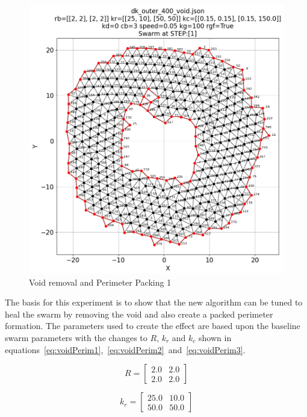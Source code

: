 \documentclass[12pt,a4paper]{IEEEtran}
\newcommand{\kc}{\mathit{k_{c}}}
\newcommand{\kr}{\mathit{k_{r}}}
\newcommand{\rb}{\mathit{R}}
\begin{document}
\begin{figure}[H]
	\begin{center}
		\includegraphics[width=1.0\linewidth]{figures/voidPerim1}
	\end{center}
	\caption{Void removal and Perimeter Packing 1\label{fig:voidPerim1}}
\end{figure}

The basis for this experiment is to show that the new algorithm can be tuned to heal the swarm by removing the void and also create a packed perimeter formation. The parameters used to create the effect are based upon the baseline swarm parameters with the changes to $\rb$, $\kr$ and $\kc$ shown in equations~\ref{eq:voidPerim1},~\ref{eq:voidPerim2}~and~\ref{eq:voidPerim3}.

\begin{equation}\label{eq:voidPerim1}
	\rb = 
	\begin{bmatrix}
	2.0 & 2.0\\
	2.0 & 2.0
	\end{bmatrix}
\end{equation}
	
\begin{equation}\label{eq:voidPerim2}
	\kr = 
	\begin{bmatrix}
	25.0 & 10.0\\
	50.0 & 50.0
	\end{bmatrix}
\end{equation}
\end{document}
